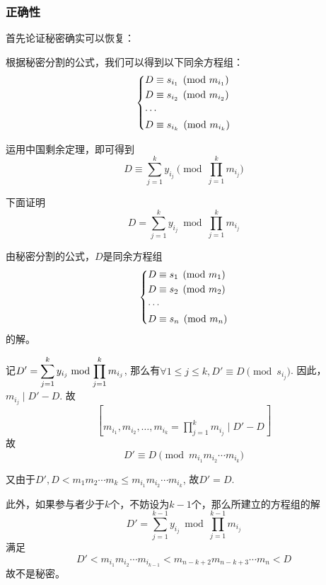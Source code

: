\subsubsection{正确性}
首先论证秘密确实可以恢复：\par
根据秘密分割的公式，我们可以得到以下同余方程组：
\begin{equation}
\begin{dcases}
D\equiv s_{i_1}\pmod{m_{i_1}}\\
D\equiv s_{i_2}\pmod{m_{i_2}}\\
\cdots\\
D\equiv s_{i_k}\pmod{m_{i_k}}
\end{dcases}
\end{equation}

运用中国剩余定理，即可得到
\begin{equation}
D\equiv\sum_{j=1}^ky_{i_j}\pmod{\prod_{j=1}^km_{i_j}}
\end{equation}

下面证明
\[D=\sum_{j=1}^ky_{i_j}\bmod{\prod_{j=1}^km_{i_j}}\]

由秘密分割的公式，$D$是同余方程组
\begin{equation}
\begin{dcases}
D\equiv s_{1}\pmod{m_{1}}\\
D\equiv s_{2}\pmod{m_{2}}\\
\cdots\\
D\equiv s_{n}\pmod{m_{n}}
\end{dcases}
\end{equation}
的解。\par
记$\displaystyle D'=\sum_{j=1}^ky_{i_j}\bmod{\prod_{j=1}^km_{i_j}}$, 那么有$\forall 1\leq j\leq k, D'\equiv D\pmod{s_{i_j}}$. 因此，$m_{i_j}\mid D'-D$. 故
\[\brack{m_{i_1}, m_{i_2}, \ldots, m_{i_k}}=\prod_{j=1}^km_{i_j}\mid D'-D\]
故
\[D'\equiv D\pmod{m_{i_1}m_{i_2}\cdots m_{i_k}}\]

又由于$D', D<m_1m_2\cdots m_k\leq m_{i_1}m_{i_2}\cdots m_{i_k}$, 故$D'=D$.\par
此外，如果参与者少于$k$个，不妨设为$k-1$个，那么所建立的方程组的解
\[D'=\sum_{j=1}^{k-1}y_{i_j}\bmod{\prod_{j=1}^{k-1}m_{i_j}}\]
满足
\[D'<m_{i_1}m_{i_2}\cdots m_{i_{k-1}}<m_{n-k+2}m_{n-k+3}\cdots m_n<D\]
故不是秘密。
